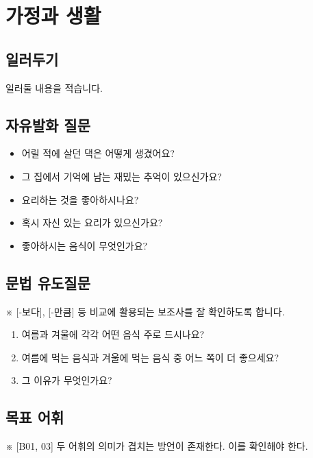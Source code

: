 \section{가정과 생활}
\subsection{일러두기}
일러둘 내용을 적습니다.

\subsection{자유발화 질문}
\begin{itemize}[noitemsep]
  \item 어릴 적에 살던 댁은 어떻게 생겼어요?
  \item 그 집에서 기억에 남는 재밌는 추억이 있으신가요?
  \item 요리하는 것을 좋아하시나요?
  \item 혹시 자신 있는 요리가 있으신가요?
  \item 좋아하시는 음식이 무엇인가요?
\end{itemize}

\subsection{문법 유도질문}
※ [-보다], [-만큼] 등 비교에 활용되는 보조사를 잘 확인하도록 합니다.

\begin{enumerate}[noitemsep]
  \item 여름과 겨울에 각각 어떤 음식 주로 드시나요?
  \item 여름에 먹는 음식과 겨울에 먹는 음식 중 어느 쪽이 더 좋으세요?
  \item 그 이유가 무엇인가요?
\end{enumerate}

\subsection{목표 어휘}
%

※ [B01, 03] 두 어휘의 의미가 겹치는 방언이 존재한다. 이를 확인해야 한다.

